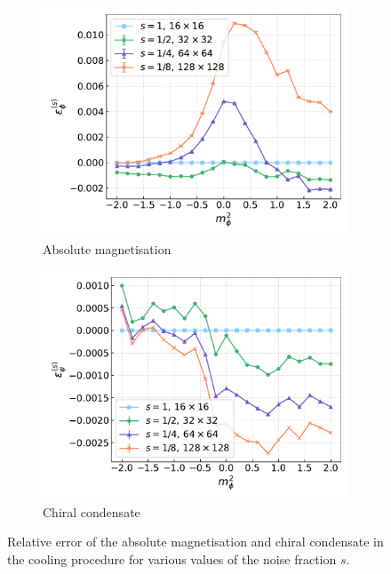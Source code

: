 \begin{figure}[htp]
    \centering
    \begin{subfigure}[b]{0.48\textwidth}
        \includegraphics[width=1.0\textwidth]{figures/cooling/mass_scan/deviation.pdf}
        \caption{Absolute magnetisation}
    \end{subfigure}
    \begin{subfigure}[b]{0.48\textwidth}
        \includegraphics[width=1.0\textwidth]{figures/cooling/mass_scan/deviation_cond.pdf}
        \caption{Chiral condensate}
    \end{subfigure}
    \caption[Relative error in the cooling procedure at tree level.]{Relative error of the absolute magnetisation and chiral condensate in the cooling procedure for various values of the noise fraction $s$.}
    \label{fig:cooling_deviation}
\end{figure}
